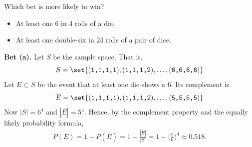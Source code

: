 \documentclass[10pt]{beamer}
\begin{document}


\begin{frame}
\small
\begin{mybluebox}[title=\text{Example: The Gambler's Puzzle (de Méré, 1654)}]
Which bet is more likely to win? 
\begin{itemize}
\item[(a)] At least one 6 in 4 rolls of a die.
\item[(b)] At least one double-six in 24 rolls of a pair of dice.
\end{itemize}

\textbf{Bet (a).}
%
Let $S$ be the sample space.  That is,
\[ S=\set{(\texttt{1,1,1,1}), (\texttt{1,1,1,2}), \hdots, (\texttt{6,6,6,6})} \]
Let $E \subset S$ be the event that at least one die shows a 6.  Its complement is
\[ \overline{E} = \set{(\texttt{1,1,1,1}), (\texttt{1,1,1,2}), \hdots, (\texttt{5,5,5,5})} \]
%
Now $|S|=6^{4}$ and $|\overline{E}|=5^{4}$.
%
Hence, by the complement property and the equally likely probability formula,
\begin{align*}
P(E) = 1 - P(\overline{E}) = 1 - \frac{|\overline{E}|}{|S|} = 1 - \bigg(\frac{5}{6}\bigg)^{4} \approx 0.518.
\end{align*}
\end{mybluebox}
\end{frame}
\end{document}
